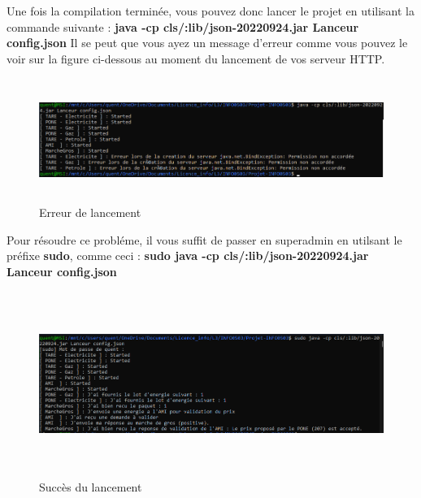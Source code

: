 Une fois la compilation terminée, vous pouvez donc lancer le projet en utilisant la commande suivante : \newline
\textbf{java -cp cls/:lib/json-20220924.jar Lanceur config.json} \newline
Il se peut que vous ayez un message d'erreur comme vous pouvez le voir sur la figure ci-dessous au moment du lancement de vos serveur HTTP.
\begin{figure}[h]
    \centering
    \includegraphics[width= 170mm, height=40mm]{images/erreurLancement.png}
    \caption{Erreur de lancement}
    \label{img:mesh3}
\end{figure}
\newpage
Pour résoudre ce probléme, il vous suffit de passer en superadmin en utilsant le préfixe \textbf{sudo}, comme ceci : \newline
\textbf{sudo java -cp cls/:lib/json-20220924.jar Lanceur config.json}
\begin{figure}[h]
    \centering
    \includegraphics[width= 170mm, height=60mm]{images/succesLancement.png}
    \caption{Succès du lancement}
    \label{img:mesh4}
\end{figure}

